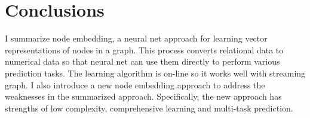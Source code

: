 \documentclass{article}
\begin{document}
\section{Conclusions}
I summarize node embedding, a neural net approach for learning vector representations of nodes in a graph. This process converts relational data to numerical data so that neural net can use them directly to perform various prediction tasks. The learning algorithm is on-line so it works well with streaming graph. I also introduce a new node embedding approach to address the weaknesses in the summarized approach. Specifically, the new approach has strengths of low complexity, comprehensive learning and multi-task prediction.



\end{document}
